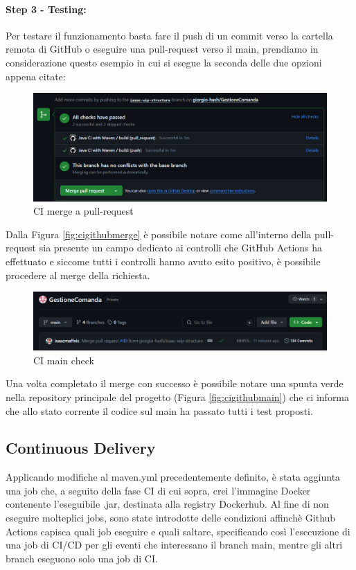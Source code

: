 \paragraph{Step 3 - Testing:}
Per testare il funzionamento basta fare il push di un commit verso la cartella remota di GitHub o eseguire una pull-request verso il main, prendiamo in considerazione questo esempio in cui si esegue la seconda delle due opzioni appena citate:
\begin{figure}[H]
    \centering
    \includegraphics[width=1\linewidth]{iterazione1//images/github_actions_merge.png}
    \caption{CI merge a pull-request}
    \label{fig:cigithubmerge}
\end{figure}
Dalla Figura \vref{fig:cigithubmerge} è possibile notare come all'interno della pull-request sia presente un campo dedicato ai controlli che GitHub Actions ha effettuato e siccome tutti i controlli hanno avuto esito positivo, è possibile procedere al merge della richiesta.
\begin{figure}[H]
    \centering
    \includegraphics[width=1\linewidth]{iterazione1//images/github_actions_main}
    \caption{CI main check}
    \label{fig:cigithubmain}
\end{figure}
Una volta completato il merge con successo è possibile notare una spunta verde nella repository principale del progetto (Figura \vref{fig:cigithubmain}) che ci informa che allo stato corrente il codice sul main ha passato tutti i test proposti.

\subsection{Continuous Delivery}
Applicando modifiche al maven.yml precedentemente definito, è stata aggiunta una job che, a seguito della fase CI di cui sopra, crei l'immagine Docker contenente l'eseguibile .jar, destinata alla registry Dockerhub.
Al fine di non eseguire molteplici jobs, sono state introdotte delle condizioni affinchè Github Actions capisca quali job eseguire e quali saltare, specificando così l'esecuzione di una job di CI/CD per gli eventi che interessano il branch main, mentre gli altri branch eseguono solo una job di CI. 

